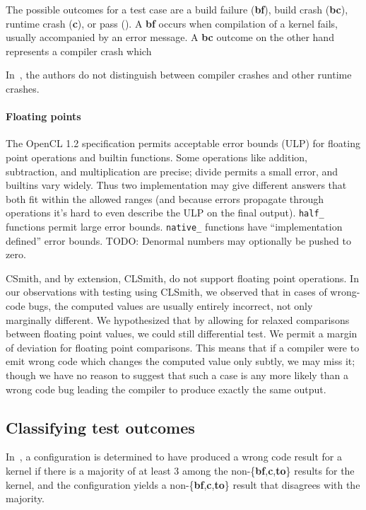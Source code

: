 The possible outcomes for a test case are a build failure (\textbf{bf}), build crash (\textbf{bc}), runtime crash (\textbf{c}), or pass (\textbf{\cmark}). A \textbf{bf} occurs when compilation of a kernel fails, usually accompanied by an error message. A \textbf{bc} outcome on the other hand represents a compiler crash which 

In~\cite{Lidbury2015a}, the authors do not distinguish between compiler crashes and other runtime crashes.

\paragraph{Floating points} The OpenCL 1.2 specification permits acceptable error bounds (ULP) for floating point operations and builtin functions. Some operations like addition, subtraction, and multiplication are precise; divide permits a small error, and builtins vary widely. Thus two implementation may give different answers that both fit within the allowed ranges (and because errors propagate through operations it's hard to even describe the ULP on the final output). \texttt{half\_} functions permit large error bounds. \texttt{native\_} functions have ``implementation defined'' error bounds. TODO: Denormal numbers may optionally be pushed to zero.

CSmith, and by extension, CLSmith, do not support floating point operations. In our observations with testing using CLSmith, we observed that in cases of wrong-code bugs, the computed values are usually entirely incorrect, not only marginally different. We hypothesized that by allowing for relaxed comparisons between floating point values, we could still differential test. We permit a margin of deviation for floating point comparisons. This means that if a compiler were to emit wrong code which changes the computed value only subtly, we may miss it; though we have no reason to suggest that such a case is any more likely than a wrong code bug leading the compiler to produce exactly the same output.


\subsection{Classifying test outcomes}

In~\cite{Lidbury2015a}, a configuration is determined to have produced a wrong code result for a kernel if there is a majority of at least 3 among the non-\{\textbf{bf},\textbf{c},\textbf{to}\} results for the kernel, and the configuration yields a non-\{\textbf{bf},\textbf{c},\textbf{to}\} result that disagrees with the majority.

